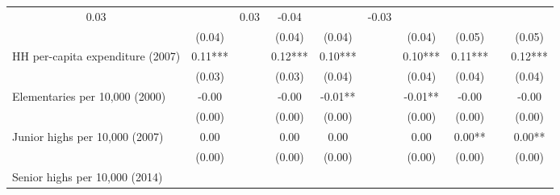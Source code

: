 \begin{tabular}{llllllllll}
  \multicolumn{1}{c}{0.03 } &
  \multicolumn{1}{c}{} &
  \multicolumn{1}{c}{0.03 } &
  \multicolumn{1}{c}{-0.04 } &
  \multicolumn{1}{c}{} &
  \multicolumn{1}{c}{-0.03 } \\
\multicolumn{1}{l}{} &
  \multicolumn{1}{|c}{(0.04)} &
  \multicolumn{1}{c}{} &
  \multicolumn{1}{c}{(0.04)} &
  \multicolumn{1}{c}{(0.04)} &
  \multicolumn{1}{c}{} &
  \multicolumn{1}{c}{(0.04)} &
  \multicolumn{1}{c}{(0.05)} &
  \multicolumn{1}{c}{} &
  \multicolumn{1}{c}{(0.05)} \\
\multicolumn{1}{l}{HH per-capita expenditure (2007)} &
  \multicolumn{1}{|c}{0.11***} &
  \multicolumn{1}{c}{} &
  \multicolumn{1}{c}{0.12***} &
  \multicolumn{1}{c}{0.10***} &
  \multicolumn{1}{c}{} &
  \multicolumn{1}{c}{0.10***} &
  \multicolumn{1}{c}{0.11***} &
  \multicolumn{1}{c}{} &
  \multicolumn{1}{c}{0.12***} \\
\multicolumn{1}{l}{} &
  \multicolumn{1}{|c}{(0.03)} &
  \multicolumn{1}{c}{} &
  \multicolumn{1}{c}{(0.03)} &
  \multicolumn{1}{c}{(0.04)} &
  \multicolumn{1}{c}{} &
  \multicolumn{1}{c}{(0.04)} &
  \multicolumn{1}{c}{(0.04)} &
  \multicolumn{1}{c}{} &
  \multicolumn{1}{c}{(0.04)} \\
\multicolumn{1}{l}{Elementaries per 10,000 (2000)} &
  \multicolumn{1}{|c}{-0.00 } &
  \multicolumn{1}{c}{} &
  \multicolumn{1}{c}{-0.00 } &
  \multicolumn{1}{c}{-0.01** } &
  \multicolumn{1}{c}{} &
  \multicolumn{1}{c}{-0.01** } &
  \multicolumn{1}{c}{-0.00 } &
  \multicolumn{1}{c}{} &
  \multicolumn{1}{c}{-0.00 } \\
\multicolumn{1}{l}{} &
  \multicolumn{1}{|c}{(0.00)} &
  \multicolumn{1}{c}{} &
  \multicolumn{1}{c}{(0.00)} &
  \multicolumn{1}{c}{(0.00)} &
  \multicolumn{1}{c}{} &
  \multicolumn{1}{c}{(0.00)} &
  \multicolumn{1}{c}{(0.00)} &
  \multicolumn{1}{c}{} &
  \multicolumn{1}{c}{(0.00)} \\
\multicolumn{1}{l}{Junior highs per 10,000 (2007)} &
  \multicolumn{1}{|c}{0.00 } &
  \multicolumn{1}{c}{} &
  \multicolumn{1}{c}{0.00 } &
  \multicolumn{1}{c}{0.00 } &
  \multicolumn{1}{c}{} &
  \multicolumn{1}{c}{0.00 } &
  \multicolumn{1}{c}{0.00** } &
  \multicolumn{1}{c}{} &
  \multicolumn{1}{c}{0.00** } \\
\multicolumn{1}{l}{} &
  \multicolumn{1}{|c}{(0.00)} &
  \multicolumn{1}{c}{} &
  \multicolumn{1}{c}{(0.00)} &
  \multicolumn{1}{c}{(0.00)} &
  \multicolumn{1}{c}{} &
  \multicolumn{1}{c}{(0.00)} &
  \multicolumn{1}{c}{(0.00)} &
  \multicolumn{1}{c}{} &
  \multicolumn{1}{c}{(0.00)} \\
\multicolumn{1}{l}{Senior highs per 10,000 (2014)} &

\end{tabular}
